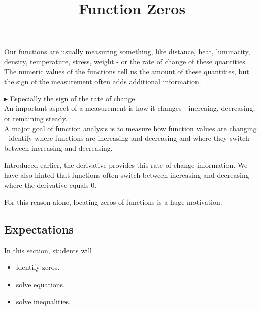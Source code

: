\documentclass{ximera}
\title{Function Zeros}
\begin{document}
\begin{abstract}
\end{abstract}
\maketitle




Our functions are usually measuring something, like distance, heat, luminacity, density, temperature, stress, weight - or the rate of change of these quantities.  The numeric values of the functions tell us the amount of these quantities, but the sign of the measurement often adds additional information. 


$\blacktriangleright$ Especially the sign of the rate of change.  \\



An important aspect of a measurement is how it changes - increaing, decreasing, or remaining steady. \\





A major goal of function analysis is to measure how function values are changing - identify where functions are increasing and decreasing and where they switch between increasing and decreasing.




Introduced earlier, the derivative provides this rate-of-change information.  We have also hinted that functions often switch between increasing and decreasing where the derivative equals $0$.

For this reason alone, locating zeros of functions is a huge motivation.







\subsection{Expectations}


\begin{sectionOutcomes}
In this section, students will 

\begin{itemize}
\item identify zeros.
\item solve equations.
\item solve inequalities.
\end{itemize}
\end{sectionOutcomes}
\end{document}
